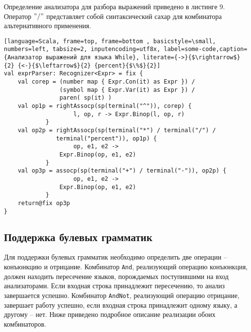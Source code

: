\documentclass[14pt]{matmex-diploma}
\begin{document}
   Определение анализатора для разбора выражений приведено в листинге 9. Оператор $"/"$ представляет собой синтаксический сахар для комбинатора альтернативного применения. 
  
  \begin{lstlisting}[language=Scala, frame=top, frame=bottom , basicstyle=\small, numbers=left, tabsize=2, inputencoding=utf8x, label=some-code,caption={Анализатор выражений для языка While}, literate={->}{$\rightarrow$}{2} {<-}{$\leftarrow$}{2} {percent}{$\%$}{2}]
val exprParser: Recognizer<Expr> = fix {
    val corep = (number map { Expr.Con(it) as Expr }) /
                (symbol map { Expr.Var(it) as Expr }) /
                paren( sp(it) )
    val op1p = rightAssocp(sp(terminal("^")), corep) {
                    l, op, r -> Expr.Binop(l, op, r) 
            }
    val op2p = rightAssocp(sp(terminal("*") / terminal("/") / 
               terminal("percent")), op1p) {
                    op, e1, e2 ->
                Expr.Binop(op, e1, e2)
            }
    val op3p = assocp(sp(terminal("+") / terminal("-")), op2p) {
                    op, e1, e2 ->
                Expr.Binop(op, e1, e2)
            }
    return@fix op3p
}
  \end{lstlisting}
  
  
  \subsection{Поддержка булевых грамматик}
Для поддержки булевых грамматик необходимо определить две операции -- конъюнкцию и отрицание. Комбинатор \lstinline[language=Scala]{And}, реализующий операцию конъюнкция, должен находить пересечение языков, порождаемых поступившими на вход анализаторами. Если входная строка принадлежит пересечению, то анализ завершается успешно. Комбинатор \lstinline[language=Scala]{AndNot}, реализующий операцию отрицание, завершает работу успешно, если входная строка принадлежит одному языку, а другому -- нет. Ниже приведено подробное описание реализации обоих комбинаторов.
\end{document}
